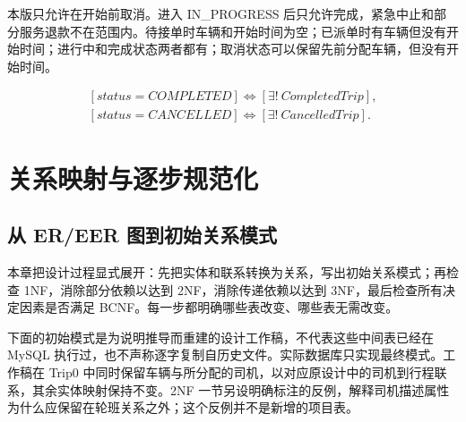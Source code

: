\documentclass[11pt,a4paper]{article}
\renewcommand{\arraystretch}{1.3}
\begin{document}
本版只允许在开始前取消。进入 IN\_\allowbreak{}PROGRESS 后只允许完成，紧急中止和部分服务退款不在范围内。待接单时车辆和开始时间为空；已派单时有车辆但没有开始时间；进行中和完成状态两者都有；取消状态可以保留先前分配车辆，但没有开始时间。


\begin{center}\end{center}
\begin{equation*}
\begin{gathered}{}[status=COMPLETED]\iff[\exists!\ CompletedTrip],\\
[status=CANCELLED]\iff[\exists!\ CancelledTrip].\end{gathered}
\end{equation*}
\clearpage
\section{关系映射与逐步规范化}
\begingroup\setlength{\parskip}{4pt}\renewcommand{\arraystretch}{1.1}\lstset{aboveskip=5pt,belowskip=5pt}
\subsection{从 ER/EER 图到初始关系模式}
本章把设计过程显式展开：先把实体和联系转换为关系，写出初始关系模式；再检查 1NF，消除部分依赖以达到 2NF，消除传递依赖以达到 3NF，最后检查所有决定因素是否满足 BCNF。每一步都明确哪些表改变、哪些表无需改变。

下面的初始模式是为说明推导而重建的设计工作稿，不代表这些中间表已经在 MySQL 执行过，也不声称逐字复制自历史文件。实际数据库只实现最终模式。工作稿在 Trip0 中同时保留车辆与所分配的司机，以对应原设计中的司机到行程联系，其余实体映射保持不变。2NF 一节另设明确标注的反例，解释司机描述属性为什么应保留在轮班关系之外；这个反例并不是新增的项目表。
\end{document}
